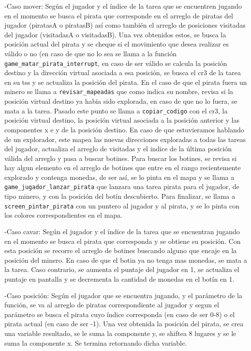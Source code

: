 \begin{enumerate}
-Caso mover: Según el jugador y el índice de la tarea que se encuentren jugando en el momento se busca el pirata que corresponde en el arreglo de piratas del jugador (piratasA o piratasB) así como también el arreglo de posiciones visitadas del jugador (visitadasA o visitadasB). Una vez obtenidos estos, se busca la posición actual del pirata y se cheque si el movimiento que desea realizar es válido o no (en caso de que no lo sea se llama a la función {\tt game\_matar\_pirata\_interrupt}, en caso de ser válido se calcula la posición destino y la dirección virtual asociada a esa posición, se busca el cr3 de la tarea en su tss y se actualiza la posición del pirata. En el caso de que el pirata fuera un minero se llama a {\tt revisar\_mapeadas} que como indica su nombre, revisa si la posición virtual destino ya habia sido explorada, en caso de que no lo fuera, se mata a la tarea.
Pasado este punto se llama a {\tt copiar\_codigo} con el cr3, la posición virtual destino, la posición virtual asociada a la posición anterior y las componentes x e y de la posición destino.
En caso de que estuvieramos hablando de un explorador, este mapea las nuevas direcciones exploradas a todas las tareas del jugador, actualiza el arreglo de visitadas y el indice de la última posición válida del arreglo y pasa a buscar botines. Para buscar los botines, se revisa si hay algun elemento en el arreglo de botines que entre en el rango recientemente explorado y contenga monedas, de ser así, se lo pinta en el mapa y se llama a {\tt game\_jugador\_lanzar\_pirata} que lanzara una tarea pirata para el jugador, de tipo minero, y con la posición del botín descubierto. Para finalizar, se llama a {\tt screen\_pintar\_pirata} con un puntero al jugador y al pirata, y se lo pinta con los colores correspondientes en el mapa.


-Caso cavar: Según el jugador y el índice de la tarea que se encuentran jugando en el momento se busca el pirata que corresponda y se obtiene su posición. Con esta posición se recorre el arreglo de botines buscando alguno que encaje en la posición del minero. En caso de que el botin ya no tenga mas monedas, se mata a la tarea. Caso contrario, se aumenta el puntaje del jugador en 1, se actualiza el puntaje en pantalla y se decrementa la cantidad de monedas en el botín en 1.

-Caso posición: Según el jugador que se encuentra jugando, y el parámetro de la función, se va al arreglo de piratas correspondiente al jugador y segun el parámetro se busca el pirata cuyo índice corresponda (en caso de ser 0-8) o el pirata actual (en caso de ser -1). Una vez obtenida la posición del pirata, se crea una variable resultado, se le suma la componente y, se shiftea 8 lugares y se le suma la componente x. Se termina retornando dicha variable.


\end{enumerate}
